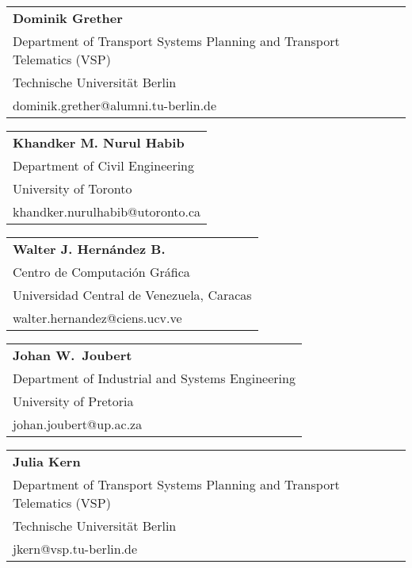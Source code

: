 \begin{tabular}[width=0.48\textwidth]{@{}l}
\textbf{Dominik Grether} \\
Department of Transport Systems Planning and Transport Telematics (VSP) \\
Technische Universität Berlin \\
dominik.grether@alumni.tu-berlin.de\\
\end{tabular}


\begin{tabular}[width=0.48\textwidth]{@{}l}
\textbf{Khandker M. Nurul Habib} \\
Department of Civil Engineering \\
University of Toronto \\
khandker.nurulhabib@utoronto.ca  \\
\end{tabular}

\begin{tabular}[width=0.48\textwidth]{@{}l}
\textbf{Walter J. Hernández B.} \\
Centro de Computación Gráfica \\
Universidad Central de Venezuela, Caracas \\
walter.hernandez@ciens.ucv.ve \\
\end{tabular}

\begin{tabular}[width=0.48\textwidth]{@{}l}
\textbf{Johan W.\ Joubert} \\
Department of Industrial and Systems Engineering \\
University of Pretoria \\
johan.joubert@up.ac.za  \\
\end{tabular}

\begin{tabular}[width=0.48\textwidth]{@{}l}
\textbf{Julia Kern} \\
Department of Transport Systems Planning and Transport Telematics (VSP) \\
Technische Universität Berlin \\
jkern@vsp.tu-berlin.de \\
\end{tabular}

